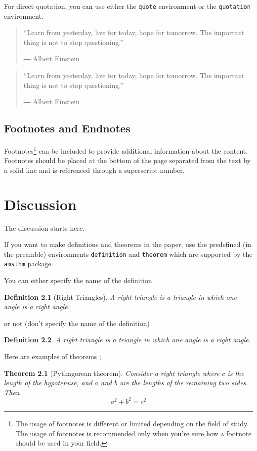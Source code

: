 \documentclass[11pt]{report}
\newtheorem{theorem}{Theorem} %
\newtheorem{definition}{Definition} %
\begin{document}
For direct quotation, you can use either the \texttt{quote} environment or the \texttt{quotation} environment.
\begin{quote}
“Learn from yesterday, live for today, hope for tomorrow. The important thing is not to stop questioning.” \par
― Albert Einstein 
\end{quote}

\begin{quotation}
“Learn from yesterday, live for today, hope for tomorrow. The important thing is not to stop questioning.” \par
― Albert Einstein 
\end{quotation}

\section{Footnotes and Endnotes}\label{sec:footnotes_endnotes}

Footnotes\footnote{The usage of footnotes is different or limited depending on the field of study. The usage of footnotes is recommended only when you’re sure how a footnote should be used in your field.} can be included to provide additional information about the content. Footnotes should be placed at the bottom of the page separated from the text by a solid line and is referenced through a superscript number.

\chapter{Discussion}\label{chap:discussion}
The discussion starts here.

If you want to make definitions and theorems in the paper, use the predefined (in the preamble) environments \texttt{definition} and \texttt{theorem} which are supported by the \texttt{amsthm} package.

You can either specify the name of the definition
\begin{definition}[Right Triangles]
A right triangle is a triangle in which one angle is a right angle.
\end{definition}
or not (don't specify the name of the definition)
\begin{definition}
A right triangle is a triangle in which one angle is a right angle.
\end{definition}

Here are examples of theorems ;
\begin{theorem}[Pythagorean theorem]
Consider a right triangle where \(c\) is the length of the hypotenuse, and \(a\) and \(b\) are the lengths of the remaining two sides.
Then
\begin{equation}
a^2+b^2=c^2
\end{equation}
\end{theorem}
\end{document}
